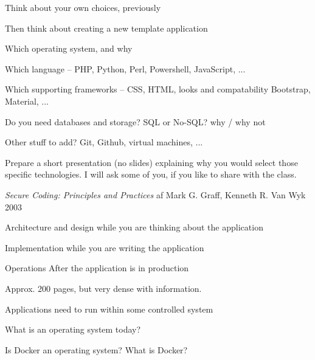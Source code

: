 \documentclass[Screen16to9,17pt]{foils}
\begin{document}


Think about your own choices, previously

Then think about creating a new template application
\begin{list2}
\item Which operating system, and why
\item Which language -- PHP, Python, Perl, Powershell, JavaScript, ...
\item Which supporting frameworks -- CSS, HTML, looks and compatability Bootstrap, Material, ...
\item Do you need databases and storage? SQL or No-SQL? why / why not
\item Other stuff to add? Git, Github, virtual machines, ...
\end{list2}

Prepare a short presentation (no slides) explaining why you would select those specific technologies. I will ask some of you, if you like to share with the class.



{\emph{Secure Coding: Principles and Practices} af Mark G. Graff, Kenneth R. Van Wyk 2003}

\begin{list2}
\item Architecture and design while you are thinking about the application
\item Implementation while you are writing the application
\item Operations After the application is in production
\item Approx. 200 pages, but very dense with information.
\end{list2}




\begin{list2}
\item Applications need to run within some controlled system
\item What is an operating system today?
\item Is Docker an operating system? What is Docker?
\end{list2}
\end{document}
